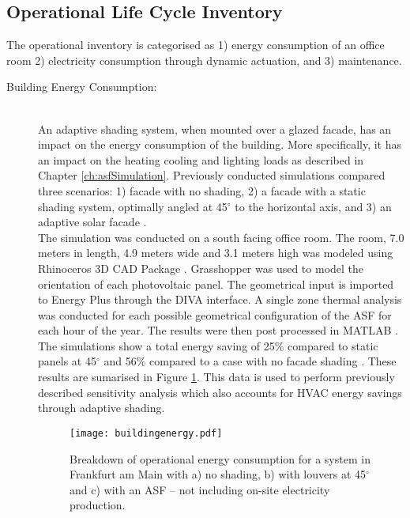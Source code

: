 \subsection{Operational Life Cycle Inventory}
\label{ch:Meth:Opp}

The operational inventory is categorised as 1) energy consumption of an office room 2) electricity consumption through dynamic actuation, and 3) maintenance.

\begin{description}


\item[Building Energy Consumption: ] \hfill\\
An adaptive shading system, when mounted over a glazed facade, has an impact on the energy consumption of the building. More specifically, it has an impact on the heating cooling and lighting loads as described in Chapter \ref{ch:asfSimulation}. Previously conducted simulations compared three scenarios: 1) facade with no shading, 2) a facade with a static shading system, optimally angled at 45$^{\circ}$ to the horizontal axis, and 3) an adaptive solar facade \cite{jayathissa2015abs}.\\

The simulation was conducted on a south facing office room. The room, 7.0 meters in length, 4.9 meters wide and 3.1 meters high was modeled using Rhinoceros 3D CAD Package \cite{Rhino}. Grasshopper \cite{grasshopper} was used to model the orientation of each photovoltaic panel. The geometrical input is imported to Energy Plus \cite{energyplus} through the DIVA \cite{DIVA} interface. A single zone thermal analysis was conducted for each possible geometrical configuration of the ASF for each hour of the year. The results were then post processed in MATLAB \cite{MATLAB}.\\

The simulations show a total energy saving of 25\% compared to static panels at 45$^\circ$ and 56\% compared to a case with no facade shading \cite{jayathissa2015abs}. These results are sumarised in Figure \ref{fig:operational}. This data is used to perform previously described sensitivity analysis which also accounts for HVAC energy savings through adaptive shading. \\




\begin{figure}[H]
\begin{center}

\texttt{[image: buildingenergy.pdf]}
\caption{Breakdown of operational energy consumption for a system in Frankfurt am Main with a) no shading, b) with louvers at 45$^\circ$ and c) with an ASF  -- not including on-site electricity production.}
\label{fig:operational}


\end{center}
\end{figure}
\end{description}
